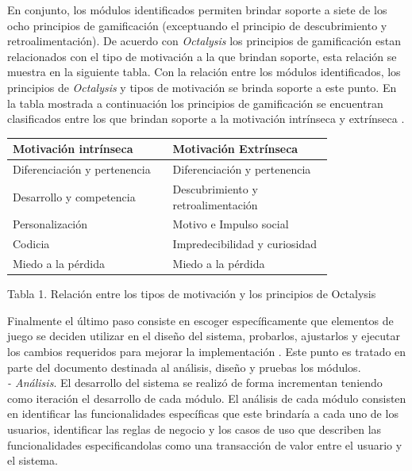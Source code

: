     En conjunto, los módulos identificados permiten brindar soporte a siete de los 
    ocho principios de gamificación (exceptuando el principio de descubrimiento y
    retroalimentación). De acuerdo con {\it Octalysis} \cite{Octalysis} los
    principios de gamificación estan relacionados con el tipo de motivación a la que
    brindan soporte, esta relación se muestra en la siguiente tabla. Con la relación
    entre los módulos identificados, los principios de {\it Octalysis} y tipos de
    motivación se brinda soporte a este punto. En la tabla mostrada a continuación
    los principios de gamificación se encuentran clasificados entre los que brindan
    soporte a la motivación intrínseca y extrínseca \cite{Octalysis}.\\

    \begin{center}
    \begin{tabular}{|p{0.4\linewidth}|p{0.4\linewidth}|} \hline
        {\bf Motivación intrínseca}  & {\bf Motivación Extrínseca} \\\hline
        Diferenciación y pertenencia & Diferenciación y pertenencia \\\hline
        Desarrollo y competencia     & Descubrimiento y retroalimentación \\\hline
        Personalización              & Motivo e Impulso social \\\hline
        Codicia                      & Impredecibilidad y curiosidad\\\hline
        Miedo a la pérdida           & Miedo a la pérdida\\\hline
    \end{tabular}\par\smallskip
    \small Tabla 1. Relación entre los tipos de motivación y los principios de
    Octalysis
    \end{center}

    \noindent
    Finalmente el último paso consiste en escoger específicamente que elementos
    de juego se deciden utilizar en el diseño del sistema, probarlos, ajustarlos y
    ejecutar los cambios requeridos para mejorar la implementación
    \cite{ForTheWin}. Este punto es tratado en parte del documento destinada
    al análisis, diseño y pruebas los módulos.\\

    {\it - Análisis}. El desarrollo del sistema se realizó de forma incrementan
    teniendo como iteración el desarrollo de cada módulo. El análisis de cada módulo
    consisten en identificar las funcionalidades específicas que este brindaría a cada
    uno de los usuarios, identificar las reglas de negocio y los casos de uso que
    describen las funcionalidades especificandolas como una transacción de valor
    entre el usuario y el sistema.\\

